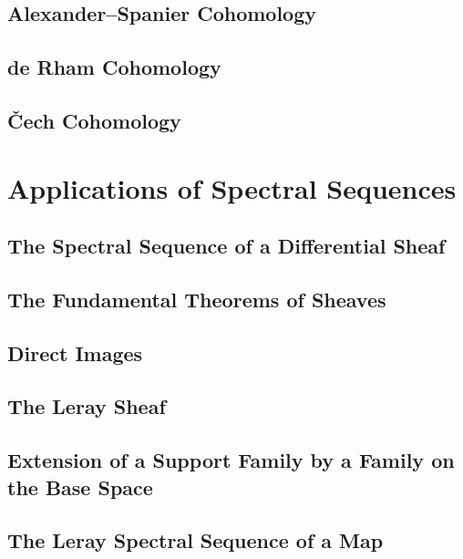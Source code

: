 \documentclass[11pt, a4paper]{article}
\begin{document}
\subsection{Alexander--Spanier Cohomology}

\subsection{de Rham Cohomology}

\subsection{\v{C}ech Cohomology}

\section{Applications of Spectral Sequences}

\subsection{The Spectral Sequence of a Differential Sheaf}

\subsection{The Fundamental Theorems of Sheaves}

\subsection{Direct Images}

\subsection{The Leray Sheaf}

\subsection{Extension of a Support Family by a Family on the Base Space}

\subsection{The Leray Spectral Sequence of a Map}
\end{document}
